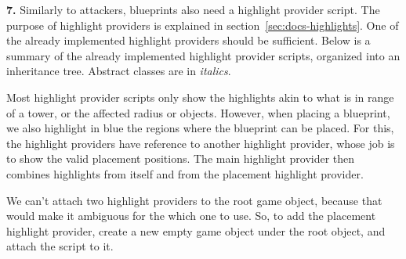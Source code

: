 \textbf{7.}
Similarly to attackers, blueprints also need a highlight provider script.
The purpose of highlight providers is explained in section~\ref{sec:docs-highlights}.
One of the already implemented highlight providers should be sufficient.
Below is a summary of the already implemented highlight provider scripts, organized into an inheritance tree.
Abstract classes are in \emph{italics}.
\

Most highlight provider scripts only show the highlights akin to what is in range of a tower, or the affected radius or objects.
However, when placing a blueprint, we also highlight in blue the regions where the blueprint can be placed.
For this, the highlight providers have reference to another highlight provider, whose job is to show the valid placement positions.
The main highlight provider then combines highlights from itself and from the placement highlight provider.

We can't attach two highlight providers to the root game object, because that would make it ambiguous for the  which one to use.
So, to add the placement highlight provider, create a new empty game object under the root object, and attach the script to it.

